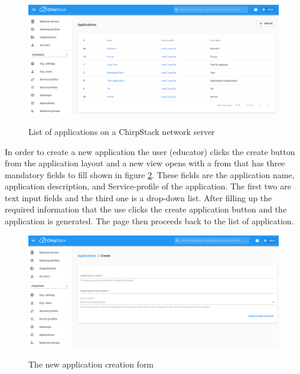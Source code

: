 \begin{figure}[ht]
  \centering
  {\includegraphics[width=\textwidth]{illustration/ChirpStack_application_list.png}}
  \caption{List of applications on a ChirpStack network server}
  \label{fig:ChirpStack_application_list}
\end{figure}

In order to create a new application the user (educator) clicks the create button from the application layout and a new view opens with a from that has three mandatory fields to fill shown in figure \ref{fig:ChirpStack_new_application}.
These fields are the application name, application description, and Service-profile of the application.
The first two are text input fields and the third one is a drop-down list.
After filling up the required information that the use clicks the create application button and the application is generated.
The page then proceeds back to the list of application.

\begin{figure}[ht]
  \centering
  {\includegraphics[width=\textwidth]{illustration/ChirpStack_new_application.png}}
  \caption{The new application creation form}
  \label{fig:ChirpStack_new_application}
\end{figure}

